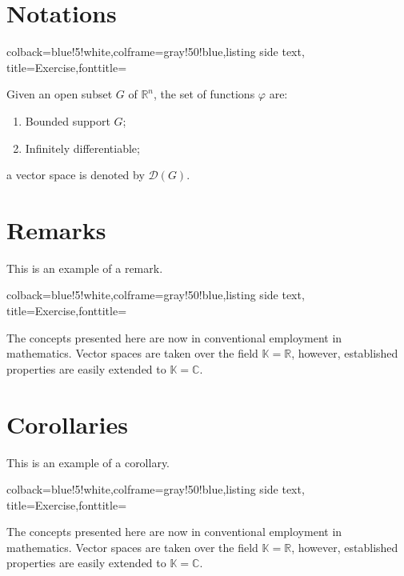 \section{Notations}

\begin{tcblisting}{colback=blue!5!white,colframe=gray!50!blue,listing side text,  title=Exercise,fonttitle=\bfseries}
\begin{notation}
Given an open subset $G$ of $\mathbb{R}^n$, the set of functions $\varphi$ are:
\begin{enumerate}
\item Bounded support $G$;
\item Infinitely differentiable;
\end{enumerate}
a vector space is denoted by $\mathcal{D}(G)$. 
\end{notation}
\end{tcblisting}


\section{Remarks}

This is an example of a remark.

\begin{tcblisting}{colback=blue!5!white,colframe=gray!50!blue,listing side text,  title=Exercise,fonttitle=\bfseries}
\begin{remark}
The concepts presented here are now in conventional employment in mathematics. Vector spaces are taken over the field $\mathbb{K}=\mathbb{R}$, however, established properties are easily extended to $\mathbb{K}=\mathbb{C}$.
\end{remark}
\end{tcblisting}


\section{Corollaries}

This is an example of a corollary.
\begin{tcblisting}{colback=blue!5!white,colframe=gray!50!blue,listing
    side text,  title=Exercise,fonttitle=\bfseries}
\begin{corollary}
The concepts presented here are now in conventional employment in mathematics. Vector spaces are taken over the field $\mathbb{K}=\mathbb{R}$, however, established properties are easily extended to $\mathbb{K}=\mathbb{C}$.
\end{corollary}
\end{tcblisting}

